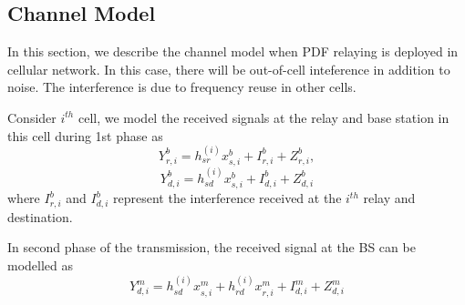 \documentclass[titlepage]{article}
\begin{document}
\subsection{Channel Model}
In this section, we describe the channel model when PDF relaying is deployed in cellular network. In this case, there will be out-of-cell inteference in addition to noise. The interference is due to frequency reuse in other cells.
\par Consider $i^{th}$ cell, we model the received signals at the relay and base station in this cell during 1st phase as
\begin{equation*}
Y_{r,i}^b = h^{(i)}_{sr}x_{s,i}^b + I_{r,i}^b + Z_{r,i}^b,
\end{equation*}
\begin{equation}
Y_{d,i}^b = h^{(i)}_{sd}x_{s,i}^b + I_{d,i}^b + Z_{d,i}^b
\end{equation}
where $I_{r,i}^b$ and $I_{d,i}^b$ represent the interference received at the $i^{th}$ relay and destination. 
\par 
In second phase of the transmission, the received signal at the BS can be modelled as 
\begin{equation}
Y_{d,i}^m = h^{(i)}_{sd}x_{s,i}^m + h^{(i)}_{rd}x_{r,i}^m+ I_{d,i}^m + Z_{d,i}^m
\end{equation}
\end{document}
